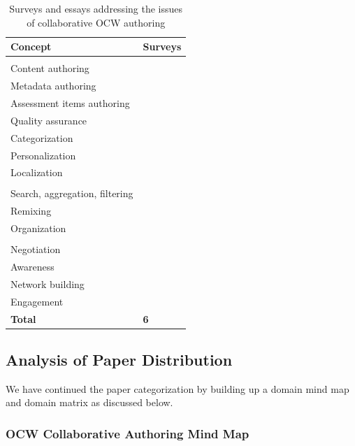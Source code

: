 \documentclass[ngerman,UKenglish,table]{scrbook}
\begin{document}
\begin{table}[!ht]
{\centering
\begin{tabulary}{0.40\textwidth}{l|l}
\toprule
Concept & Surveys \\
\midrule
{}
\\
Content authoring & \\
Metadata authoring & \cite{Ola2009} \\
Assessment items authoring & \\
Quality assurance & \\
Categorization & \\
Personalization & \cite{Brusilovsky2003, Chiribuca2008, Lee2010}\\
Localization & \\
\\
Search, aggregation, filtering  & \\
Remixing & \\
Organization & \\
\\
Negotiation & \cite{Johnson200145}\\
Awareness & \cite{Johnson200145}\\
Network building & \cite{Johnson200145, blau2013collaboration}\\
Engagement & \cite{Johnson200145, blau2013collaboration}\\
\midrule

\textbf{Total} & \textbf{6}\\
\bottomrule

\end{tabulary}
\caption{Surveys and essays addressing the issues of collaborative OCW authoring}
\label{tab:survey_2}
}

\end{table}

\subsection{Analysis of Paper Distribution}

We have continued the paper categorization by building up a domain mind map and domain matrix as discussed below.

\subsubsection{OCW Collaborative Authoring Mind Map}
\label{sec:mind_map}
\end{document}
